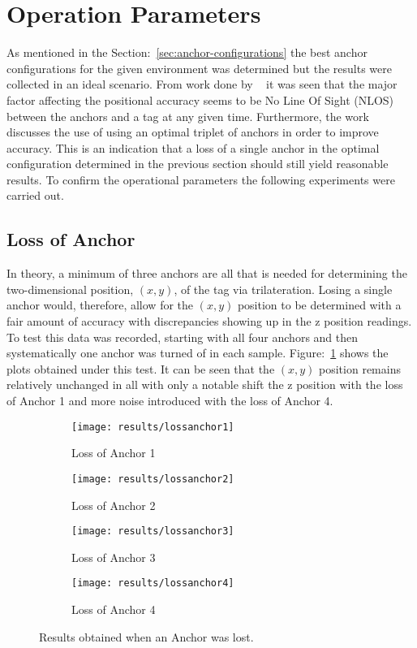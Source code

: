 \section{Operation Parameters}\label{sec:op-params}
As mentioned in the Section:~\ref{sec:anchor-configurations} the best anchor configurations for the given environment was determined  but the results were collected in an ideal scenario.
From work done by ~\citet{evaluwb} it was seen that the major factor affecting the positional accuracy seems to be No Line Of Sight (NLOS) between the anchors and a tag at any given time.
Furthermore, the work discusses the use of using an optimal triplet of anchors in order to improve accuracy.
This is an indication that a loss of a single anchor in the optimal configuration determined in the previous section should still yield reasonable results.
To confirm the operational parameters the following experiments were carried out.

\subsection{Loss of Anchor}\label{subsec:loss-of-anchor}
In theory, a minimum of three anchors are all that is needed for determining the two-dimensional position, $(x,y)$, of the tag via trilateration.
Losing a single anchor would, therefore, allow for the $(x,y)$ position to be determined with a fair amount of accuracy with discrepancies showing up in the z position readings.
To test this data was recorded, starting with all four anchors and then systematically one anchor was turned of in each sample.
Figure:~\ref{fig:Loss_anchors} shows the plots obtained under this test.
It can be seen that the $(x,y)$ position remains relatively unchanged in all with only a notable shift the z position with the loss of Anchor 1 and more noise introduced with the loss of Anchor 4.

\begin{figure}[h!]
    \centering
    \begin{subfigure}{0.45\textwidth}
            \texttt{[image: results/lossanchor1]}
            \caption{Loss of Anchor 1}
    \end{subfigure}
    \begin{subfigure}{0.45\textwidth}
            \texttt{[image: results/lossanchor2]}
            \caption{Loss of Anchor 2}
    \end{subfigure}

    \begin{subfigure}{0.45\textwidth}
            \texttt{[image: results/lossanchor3]}
            \caption{Loss of Anchor 3}
    \end{subfigure}
    \begin{subfigure}{0.45\textwidth}
            \texttt{[image: results/lossanchor4]}
            \caption{Loss of Anchor 4}
    \end{subfigure}
    \caption{Results obtained when an Anchor was lost.}
    \label{fig:Loss_anchors}
\end{figure}
\newpage
